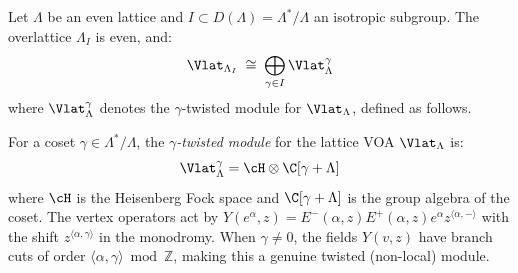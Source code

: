 \begin{theorem}\label{thm:lattice:overlattice}
Let $\Lambda$ be an even lattice and $I \subset D(\Lambda) = \Lambda^*/\Lambda$
an isotropic subgroup. The overlattice $\Lambda_I$ is even, and:
\begin{equation}\label{eq:lattice:overlattice}
\Vlat_{\Lambda_I}
\;\cong\; \bigoplus_{\gamma \in I} \Vlat_\Lambda^\gamma
\end{equation}
where $\Vlat_\Lambda^\gamma$ denotes the $\gamma$-twisted module
for $\Vlat_\Lambda$, defined as follows.

\begin{definition}\label{def:twisted-module-lattice}
For a coset $\gamma \in \Lambda^*/\Lambda$, the \emph{$\gamma$-twisted module} for the lattice VOA $\Vlat_\Lambda$ is:
\[
\Vlat_\Lambda^\gamma = \cH \otimes \C[\gamma + \Lambda]
\]
where $\cH$ is the Heisenberg Fock space and $\C[\gamma + \Lambda]$ is the group algebra of the coset. The vertex operators act by $Y(e^\alpha, z) = E^-(\alpha, z) E^+(\alpha, z) e^\alpha z^{\langle \alpha, - \rangle}$ with the shift $z^{\langle \alpha, \gamma \rangle}$ in the monodromy. When $\gamma \neq 0$, the fields $Y(v, z)$ have branch cuts of order $\langle \alpha, \gamma \rangle \bmod \mathbb{Z}$, making this a genuine twisted (non-local) module.
\end{definition}
\end{theorem}

